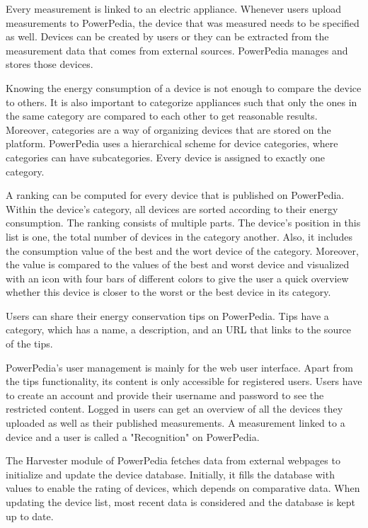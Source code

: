 Every measurement is linked to an electric appliance. Whenever users upload measurements to PowerPedia, the device that was measured needs to be specified as well. Devices can be created by users or they can be extracted from the measurement data that comes from external sources. PowerPedia manages and stores those devices.  

Knowing the energy consumption of a device is not enough to compare the device to others. It is also important to categorize appliances such that only the ones in the same category are compared to each other to get reasonable results. Moreover, categories are a way of organizing devices that are stored on the platform. PowerPedia uses a hierarchical scheme for device categories, where categories can have subcategories. Every device is assigned to exactly one category. 

A ranking can be computed for every device that is published on PowerPedia. Within the device's category, all devices are sorted according to their energy consumption. The ranking consists of multiple parts. The device's position in this list is one, the total number of devices in the category another. Also, it includes the consumption value of the best and the wort device of the category. Moreover, the value is compared to the values of the best and worst device and visualized with an icon with four bars of different colors to give the user a quick overview whether this device is closer to the worst or the best device in its category. 

Users can share their energy conservation tips on PowerPedia. Tips have a category, which has a name, a description, and an URL that links to the source of the tips.
		 
PowerPedia's user management is mainly for the web user interface. 
Apart from the tips functionality, its content is only accessible for registered users. Users have to create an account and provide their username and password to see the restricted content. 
Logged in users can get an overview of all the devices they uploaded as well as their published measurements. A measurement linked to a device and a user is called a "Recognition" on PowerPedia.
  
The Harvester module of PowerPedia fetches data from external webpages to initialize and update the device database. Initially, it fills the database with values to enable the rating of devices, which depends on comparative data. When updating the device list, most recent data is considered and the database is kept up to date. 

